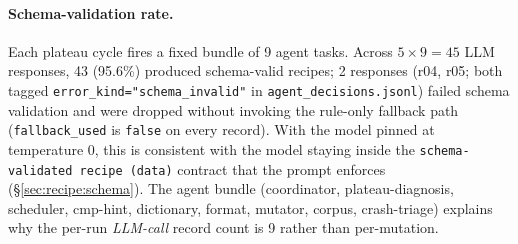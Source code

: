 \documentclass[11pt]{article}
\begin{document}
\paragraph{Schema-validation rate.}
Each plateau cycle fires a fixed bundle of 9 agent tasks. Across
$5 \times 9 = 45$ LLM responses, 43 (95.6\%) produced schema-valid
recipes; 2 responses (r04, r05; both tagged
\texttt{error\_kind="schema\_invalid"} in
\texttt{agent\_decisions.jsonl}) failed schema validation and were
dropped without invoking the rule-only fallback path
(\texttt{fallback\_used} is \texttt{false} on every record). With the
model pinned at temperature 0, this is consistent with the model
staying inside the \texttt{schema-validated recipe (data)} contract
that the prompt enforces (\S\ref{sec:recipe:schema}). The agent
bundle (coordinator, plateau-diagnosis, scheduler, cmp-hint,
dictionary, format, mutator, corpus, crash-triage) explains why the
per-run \emph{LLM-call} record count is 9 rather than per-mutation.
\end{document}
